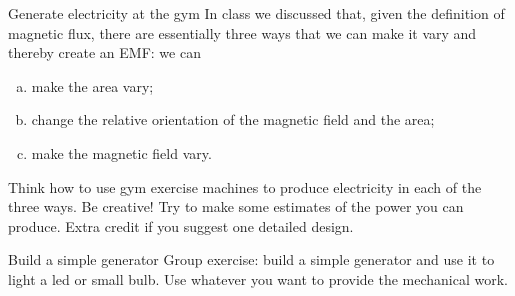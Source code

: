 \documentclass[makesolutionspdf]{esg8022pset}
\begin{document}
\begin{problem}{Generate electricity at the gym}
  In class we discussed that, given the definition of magnetic flux, there are
  essentially three ways that we can make it vary and thereby create an EMF: we
  can
  \begin{enumerate}[(a)]
    \item make the area vary;
    \item change the relative orientation of the magnetic field and the area;
    \item make the magnetic field vary.
  \end{enumerate}
  
  Think how to use gym exercise machines to produce electricity in each of the
  three ways. Be creative! 
  Try to make some estimates of the power you can produce. Extra credit if you
  suggest one detailed design.
\end{problem}


\begin{problem}{Build a simple generator}
  Group exercise: build a simple generator and use it to light a led or small
  bulb. Use whatever you want to provide the mechanical work.
\end{problem}
\end{document}
